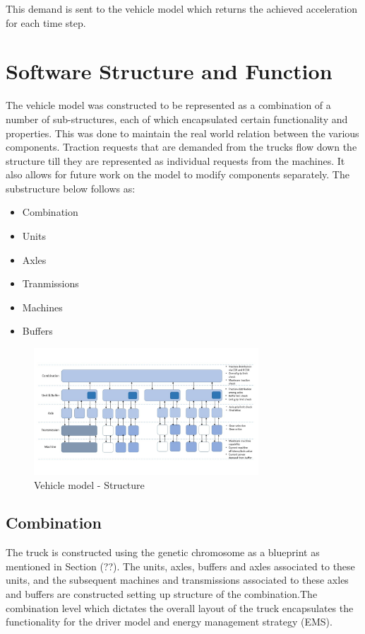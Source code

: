 \documentclass[ExampleMasters.tex]{subfiles}
\begin{document}
This demand is sent to the vehicle model which returns the achieved acceleration for each time step.

\section{Software Structure and Function}
The vehicle model was constructed to be represented as a combination of a number of sub-structures, each of which encapsulated certain functionality and properties. This was done to maintain the real world relation between the various components. Traction requests that are demanded from the trucks flow down the structure till they are represented as individual requests from the machines. It also allows for future work on the model to modify components separately. The substructure below follows as:

\begin{itemize}
\item Combination
\item Units
\item Axles
\item Tranmissions
\item Machines
\item Buffers
\end{itemize}

\begin{figure}[ht!]
	\begin{center}
		\includegraphics[width=0.75\textwidth]{figures/VehicleModel/vehiclelayout.jpg}
	\end{center}
	\caption{Vehicle model - Structure}
	\label{fig:vehiclelayout}
\end{figure}

\subsection{Combination}\label{sec:combinationstructure}
The truck is constructed using the genetic chromosome as a blueprint as mentioned in Section (??). The units, axles, buffers and axles associated to these units, and the subsequent machines and transmissions associated to these axles and buffers are constructed setting up structure of the combination.The combination level which dictates the overall layout of the truck encapsulates the functionality for the driver model and energy management strategy (EMS).
\end{document}
